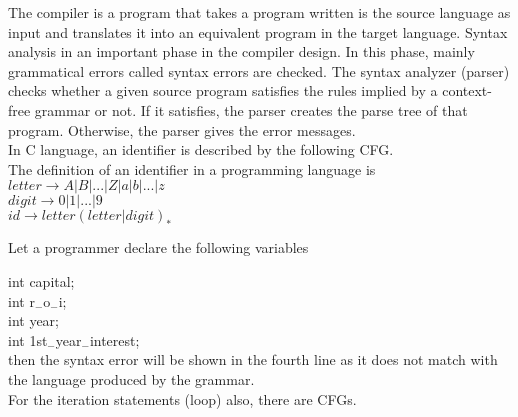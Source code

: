 \documentclass[a4]{article}
\begin{document}
\vspace*{0.2cm}
\small{
The compiler is a program that takes a program written is the source language as input and translates it
into an equivalent program in the target language. Syntax analysis in an important phase in the compiler
design. In this phase, mainly grammatical errors called syntax errors are checked. The syntax analyzer
(parser) checks whether a given source program satisfies the rules implied by a context-free grammar
or not. If it satisfies, the parser creates the parse tree of that program. Otherwise, the parser gives the
error messages.\\
\hspace*{0.5cm} In C language, an identifier is described by the following CFG.\\
\hspace*{0.5cm} The definition of an identifier in a programming language is\\

\vspace*{0.2cm}
\hspace*{4cm} $letter \rightarrow A | B | . . . | Z | a | b | ... | z$ \\
\hspace*{4cm} $digit \rightarrow 0 | 1 | . . . | 9$ \\
\hspace*{4.5cm} $id \rightarrow letter (letter | digit)_{*}$ \\
\vspace*{0.2cm}

Let a programmer declare the following variables
}
\vspace*{0.2cm}

\hspace*{1cm} int capital;\\
\hspace*{1cm} int r$_{-}$o$_{-}$i;\\
\hspace*{1cm} int year;\\
\hspace*{1cm} int 1st$_{-}$year$_{-}$interest;\\

\vspace*{0.2cm}
then the syntax error will be shown in the fourth line as it does not match with the language produced
by the grammar.\\
\hspace*{0.5cm} For the iteration statements (loop) also, there are CFGs.\\
\end{document}
